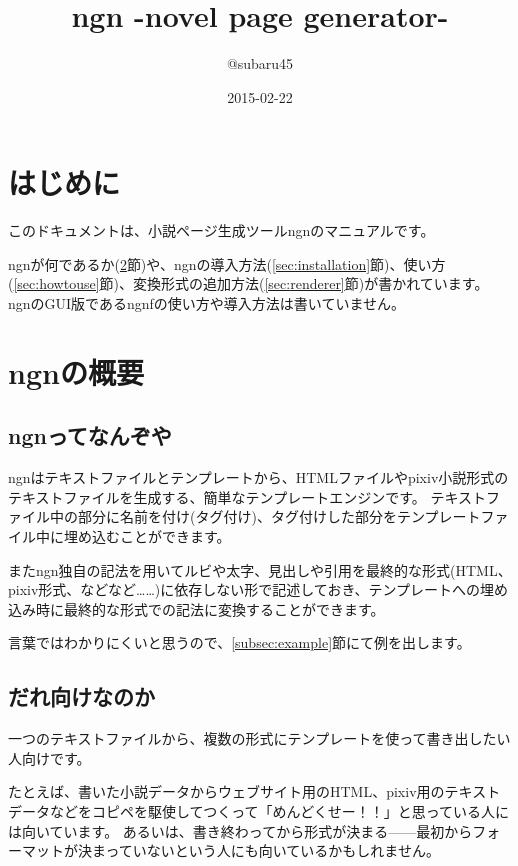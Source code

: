 \documentclass[a4j]{jsarticle}
\begin{document}
\title{ngn -novel page generator-}
\author{@subaru45}
\date{2015-02-22}
\maketitle



\section{はじめに}

このドキュメントは、小説ページ生成ツールngnのマニュアルです。

ngnが何であるか(\ref{sec:abstract}節)や、ngnの導入方法(\ref{sec:installation}節)、使い方(\ref{sec:howtouse}節)、変換形式の追加方法(\ref{sec:renderer}節)が書かれています。
ngnのGUI版であるngnfの使い方や導入方法は書いていません。



\section{ngnの概要}
\label{sec:abstract}

\subsection{ngnってなんぞや}
ngnはテキストファイルとテンプレートから、HTMLファイルやpixiv小説形式のテキストファイルを生成する、簡単なテンプレートエンジンです。
テキストファイル中の部分に名前を付け(タグ付け)、タグ付けした部分をテンプレートファイル中に埋め込むことができます。

またngn独自の記法を用いてルビや太字、見出しや引用を最終的な形式(HTML、pixiv形式、などなど……)に依存しない形で記述しておき、テンプレートへの埋め込み時に最終的な形式での記法に変換することができます。

言葉ではわかりにくいと思うので、\ref{subsec:example}節にて例を出します。


\subsection{だれ向けなのか}

一つのテキストファイルから、複数の形式にテンプレートを使って書き出したい人向けです。

たとえば、書いた小説データからウェブサイト用のHTML、pixiv用のテキストデータなどをコピペを駆使してつくって「めんどくせー！！」と思っている人には向いています。
あるいは、書き終わってから形式が決まる——最初からフォーマットが決まっていないという人にも向いているかもしれません。
\end{document}
